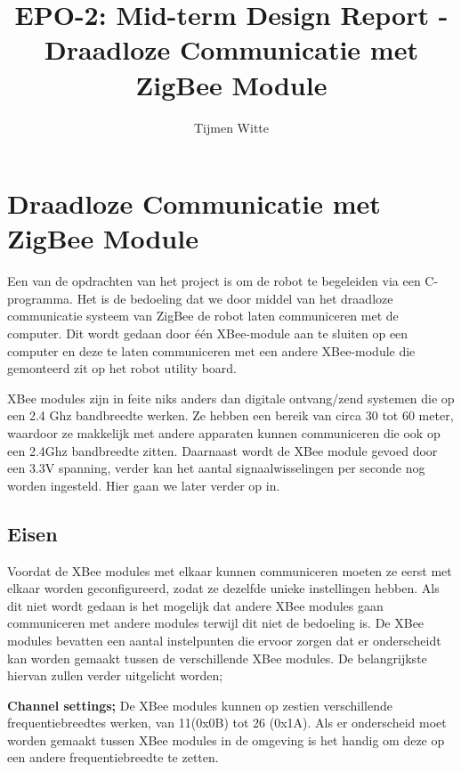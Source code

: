 \documentclass{report}
\title{EPO-2: Mid-term Design Report - Draadloze Communicatie met ZigBee Module}
\author{Tijmen Witte}
\begin{document}







\chapter{Draadloze Communicatie met ZigBee Module}

Een van de opdrachten van het project is om de robot te begeleiden via een C-programma.
Het is de bedoeling dat we door middel van het draadloze communicatie systeem van ZigBee de robot laten communiceren met de computer.
Dit wordt gedaan door één XBee-module aan te sluiten op een computer en deze te laten communiceren met een andere XBee-module die  gemonteerd zit op het robot utility board.
\newline

\noindent XBee modules zijn in feite niks anders dan digitale ontvang/zend systemen die op een 2.4 Ghz bandbreedte werken.
Ze hebben een bereik van circa 30 tot 60 meter, waardoor ze makkelijk met andere apparaten kunnen communiceren die ook op een 2.4Ghz bandbreedte zitten.
Daarnaast wordt de XBee module gevoed door een 3.3V spanning, verder kan het aantal signaalwisselingen per seconde nog worden ingesteld.
Hier gaan we later  verder op in.
\newline



\section{Eisen}

Voordat de XBee modules met elkaar kunnen communiceren moeten ze eerst met elkaar worden geconfigureerd, zodat ze dezelfde unieke instellingen hebben.
Als dit niet wordt gedaan is het mogelijk dat andere XBee modules gaan communiceren met andere modules terwijl dit niet de bedoeling is.
\newline
De XBee modules bevatten een aantal instelpunten die ervoor zorgen dat er onderscheidt kan worden gemaakt tussen de verschillende XBee modules.
De belangrijkste hiervan zullen verder uitgelicht worden;
\newline

\textbf{Channel settings;}
\newline
De XBee modules kunnen op zestien verschillende frequentiebreedtes werken, van 11(0x0B) tot 26 (0x1A).
Als er onderscheid moet worden gemaakt tussen XBee modules in de omgeving is het handig om deze op een andere frequentiebreedte te zetten.
\newline
\end{document}

